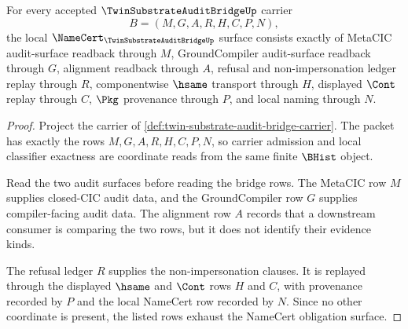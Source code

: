 \begin{theorem}
\label{thm:twin-substrate-audit-bridge-namecert-obligations}
For every accepted $\TwinSubstrateAuditBridgeUp$ carrier
$$
B=(M,G,A,R,H,C,P,N),
$$
the local $\NameCert_{\TwinSubstrateAuditBridgeUp}$ surface consists exactly of MetaCIC audit-surface readback through $M$, GroundCompiler audit-surface readback through $G$, alignment readback through $A$, refusal and non-impersonation ledger replay through $R$, componentwise $\hsame$ transport through $H$, displayed $\Cont$ replay through $C$, $\Pkg$ provenance through $P$, and local naming through $N$.
\end{theorem}
\begin{proof}
Project the carrier of \autoref{def:twin-substrate-audit-bridge-carrier}. The packet has exactly the rows $M,G,A,R,H,C,P,N$, so carrier admission and local classifier exactness are coordinate reads from the same finite $\BHist$ object.

Read the two audit surfaces before reading the bridge rows. The MetaCIC row $M$ supplies closed-CIC audit data, and the GroundCompiler row $G$ supplies compiler-facing audit data. The alignment row $A$ records that a downstream consumer is comparing the two rows, but it does not identify their evidence kinds.

The refusal ledger $R$ supplies the non-impersonation clauses. It is replayed through the displayed $\hsame$ and $\Cont$ rows $H$ and $C$, with provenance recorded by $P$ and the local NameCert row recorded by $N$. Since no other coordinate is present, the listed rows exhaust the NameCert obligation surface.
\end{proof}

